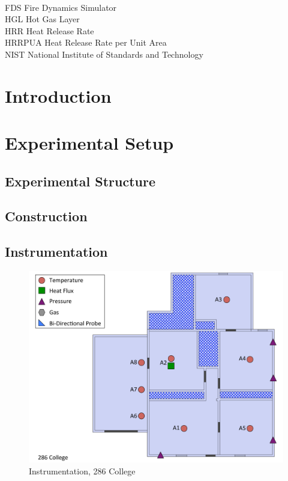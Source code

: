 \documentclass[12pt,oneside]{book}
\begin{document}
\begin{tabbing}
\hspace{1.5in} \= \\
FDS \> Fire Dynamics Simulator \\
HGL \> Hot Gas Layer \\
HRR \> Heat Release Rate \\
HRRPUA \> Heat Release Rate per Unit Area \\
NIST \> National Institute of Standards and Technology \\
\end{tabbing}

\mainmatter

\chapter{Introduction}
\label{chap:Introduction}

\chapter{Experimental Setup}
\label{chap:Experimental_Setup}

\section{Experimental Structure}
\label{sec:Experimental_Structure}

\section{Construction}
\label{sec:Construction}

\section{Instrumentation}
\label{sec:Instrumentation}

\begin{figure}[!ht]
\includegraphics[width=6.5in]{../Drawings/Instrumentation/286_College}
\caption{Instrumentation, 286 College}
\label{fig:Instrumentation_286_College}
\end{figure}
\end{document}
